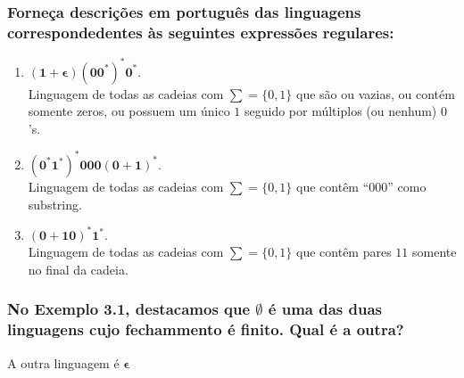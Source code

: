 \documentclass[a4paper,12pt]{article}
\begin{document}
            \subsubsection{Forneça descrições em português das linguagens correspon\-dedentes às seguintes expressões regulares:}
            \begin{enumerate}[label={\bfseries \alph*)}]
                \item $\mathbf{(1+\epsilon)(00^*)^*0^*}$.
                    \\ Linguagem de todas as cadeias com $\sum=\{0,1\}$ que são ou vazias, ou contém somente zeros, ou possuem um único $1$ seguido por múltiplos (ou nenhum) $0$'s.
                \item $\mathbf{(0^*1^*)^*000(0+1)^*}$.
                    \\ Linguagem de todas as cadeias com $\sum=\{0,1\}$ que contêm “000” como substring.
                \item $\mathbf{(0+10)^*1^*}$.
                    \\ Linguagem de todas as cadeias com $\sum=\{0,1\}$ que contêm pares $11$ somente no final da cadeia.
            \end{enumerate}

            \subsubsection{No Exemplo 3.1, destacamos que $\emptyset$ é uma das duas linguagens cujo fechammento é finito. Qual é a outra?}
                A outra linguagem é $\mathbf{\epsilon}$
\end{document}
